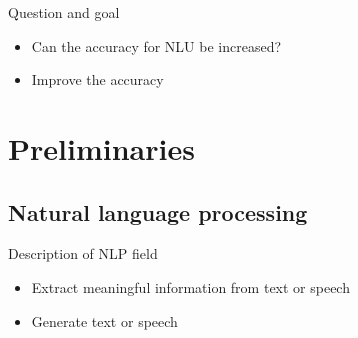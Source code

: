 \documentclass[pdf]{beamer}
\begin{document}
    \begin{frame}{Question and goal}
        \begin{itemize}
            \item Can the accuracy for NLU be increased?
            \item Improve the accuracy
        \end{itemize}
    \end{frame}


    \section{Preliminaries}
    \subsection{Natural language processing}
    \begin{frame}{Description of NLP field}
        \begin{itemize}
            \item Extract meaningful information from text or speech
            \item Generate text or speech
        \end{itemize}
    \end{frame}
\end{document}
